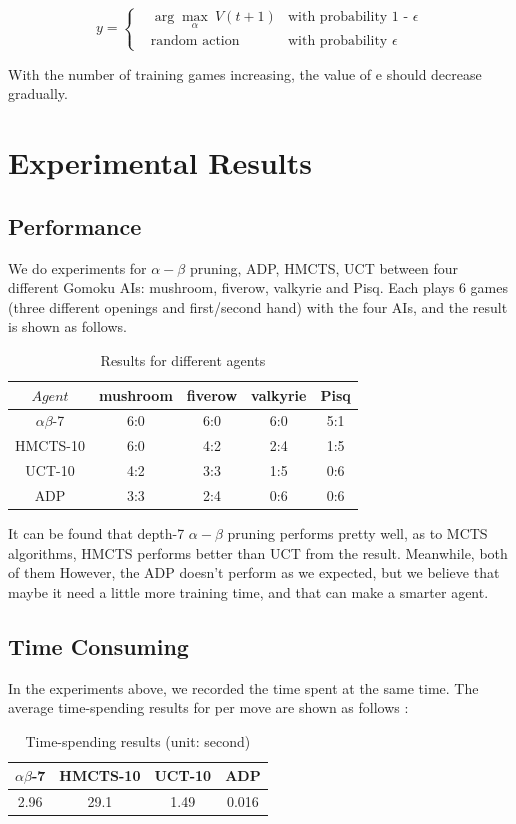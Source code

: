 \documentclass[sigconf, nonacm]{acmart}
\begin{document}
$$ y=\left\{
\begin{aligned}
&\arg \max_\alpha\ V(t+1) &\text{with probability 1 - }\epsilon \\
&\text{random action} &\text{with probability }\epsilon
\end{aligned}
\right.
$$

%
With the number of training games increasing, the value of e should decrease gradually.
%







\section{Experimental Results}
\subsection{Performance}
\quad We do experiments for $\alpha-\beta$ pruning, ADP, HMCTS, UCT between four different Gomoku AIs: mushroom, fiverow, valkyrie and Pisq. Each plays 6 games (three different openings and first/second hand) with the four AIs, and the result is shown as follows.
\begin{table}[h]
\caption{Results for different agents}
    \centering
    \label{table1} 
    \begin{tabular}{|c|c|c|c|c|}
    \hline
    $Agent$&mushroom&fiverow&valkyrie&Pisq\\
    \hline
    $\alpha\beta$-7&6:0&6:0&6:0&5:1\\
    \hline
    HMCTS-10&6:0 &4:2 &2:4 &1:5 \\
    \hline
    UCT-10&4:2 &3:3 &1:5 &0:6 \\
    \hline
    ADP& 3:3&2:4 &0:6 &0:6 \\
    \hline
    \end{tabular}
\end{table}

It can be found that depth-7 $\alpha-\beta$ pruning performs pretty well, as to MCTS algorithms, HMCTS performs better than UCT from the result. Meanwhile, both of them However, the ADP doesn't perform as we expected, but we believe that maybe it need a little more training time, and that can make a smarter agent.


\subsection{Time Consuming}
\quad In the experiments above, we recorded the time spent at the same time. The average time-spending results for per move are shown as follows :
\begin{table}[h]%
  \caption{Time-spending results (unit: second)}
  \label{tab:freq}
  \begin{tabular}{cccc}
    \toprule
     $\alpha\beta$-7&HMCTS-10&UCT-10&ADP\\
    \midrule
    2.96 & 29.1 & 1.49& 0.016\\
  \bottomrule
\end{tabular}
\end{table}
\end{document}
